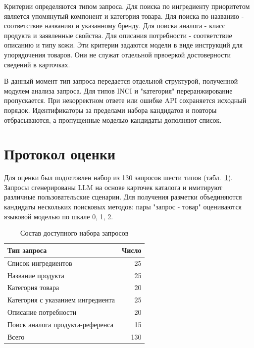 \documentclass{misisarticle}
\begin{document}
Критерии определяются типом запроса. Для поиска по ингредиенту приоритетом является упомянутый компонент и категория товара. Для поиска по названию - соответствие названию и указанному бренду. Для поиска аналога - класс продукта и заявленные свойства. Для описания потребности - соответствие описанию и типу кожи. Эти критерии задаются модели в виде инструкций для упорядочения товаров. Они не служат отдельной првоеркой достоверности сведений в карточках.

В данный момент тип запроса передается отдельной структурой, полученной модулем анализа запроса. Для типов INCI и "категория" переранжирование пропускается. При некорректном ответе или ошибке API сохраняется исходный порядок. Идентификаторы за пределами набора кандидатов и повторы отбрасываются, а пропущенные моделью кандидаты дополняют список.

\section{Протокол оценки}

Для оценки был подготовлен набор из 130 запросов шести типов (табл.~\ref{tab:queries}). Запросы сгенерированы LLM на основе карточек каталога и имитируют различные пользовательские сценарии. Для получения разметки объединяются кандидаты нескольких поисковых методов: пары "запрос - товар" оцениваются языковой моделью по шкале 0, 1, 2. 

\begin{table}[!htbp]
\caption{Состав доступного набора запросов}
\label{tab:queries}
\centering
\begin{tabular}{@{}p{}r@{}}
\toprule
Тип запроса & Число \\
\midrule
Список ингредиентов & 25 \\
Название продукта & 25 \\
Категория товара & 20 \\
Категория с указанием ингредиента & 25 \\
Описание потребности & 20 \\
Поиск аналога продукта-референса & 15 \\
\midrule
Всего & 130 \\
\bottomrule
\end{tabular}
\end{table}
\end{document}
